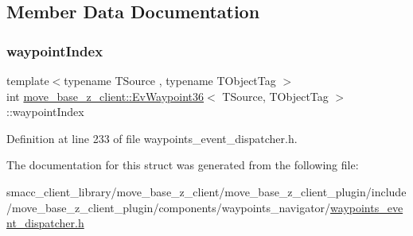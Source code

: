 \subsection{Member Data Documentation}
\mbox{\label{structmove__base__z__client_1_1EvWaypoint36_a886363b1e3dca28236356909d9a4678c}} 
\subsubsection{\texorpdfstring{waypoint\+Index}{waypointIndex}}
{\footnotesize\ttfamily template$<$typename T\+Source , typename T\+Object\+Tag $>$ \\
int \hyperlink{structmove__base__z__client_1_1EvWaypoint36}{move\+\_\+base\+\_\+z\+\_\+client\+::\+Ev\+Waypoint36}$<$ T\+Source, T\+Object\+Tag $>$\+::waypoint\+Index}



Definition at line 233 of file waypoints\+\_\+event\+\_\+dispatcher.\+h.



The documentation for this struct was generated from the following file\+:\begin{DoxyCompactItemize}
\item 
smacc\+\_\+client\+\_\+library/move\+\_\+base\+\_\+z\+\_\+client/move\+\_\+base\+\_\+z\+\_\+client\+\_\+plugin/include/move\+\_\+base\+\_\+z\+\_\+client\+\_\+plugin/components/waypoints\+\_\+navigator/\hyperlink{waypoints__event__dispatcher_8h}{waypoints\+\_\+event\+\_\+dispatcher.\+h}\end{DoxyCompactItemize}
